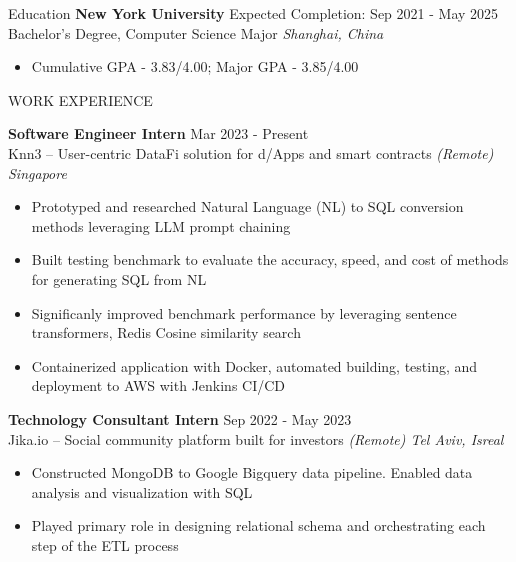\documentclass{resume} %
\begin{document}

\begin{rSection}{Education}
	\textbf{New York University} \hfill Expected Completion: Sep 2021 - May 2025\\
	Bachelor's Degree, Computer Science Major \hfill \textit{Shanghai, China}
	\begin{itemize}
		\item Cumulative GPA - 3.83/4.00; Major GPA - 3.85/4.00
	\end{itemize}
\end{rSection}


\begin{rSection}{WORK EXPERIENCE}

	\textbf{Software Engineer Intern} \hfill Mar 2023 - Present\\
	Knn3 – User-centric DataFi solution for d/Apps and smart contracts  \hfill \textit{(Remote) Singapore}
	\begin{itemize}
		\item Prototyped and researched Natural Language (NL) to SQL conversion methods leveraging LLM prompt chaining
		\item Built testing benchmark to evaluate the accuracy, speed, and cost of methods for generating SQL from NL
		\item Significanly improved benchmark performance by leveraging sentence transformers, Redis Cosine similarity search
		\item Containerized application with Docker, automated building, testing, and deployment to AWS with Jenkins CI/CD
	\end{itemize}

	\textbf{Technology Consultant Intern} \hfill Sep 2022 - May 2023\\
	Jika.io – Social community platform built for investors \hfill \textit{(Remote) Tel Aviv, Isreal}
	\begin{itemize}
		\item Constructed MongoDB to Google Bigquery data pipeline. Enabled data analysis and visualization with SQL
		\item Played primary role in designing relational schema and orchestrating each step of the ETL process
	\end{itemize}
\end{rSection}
\end{document}
